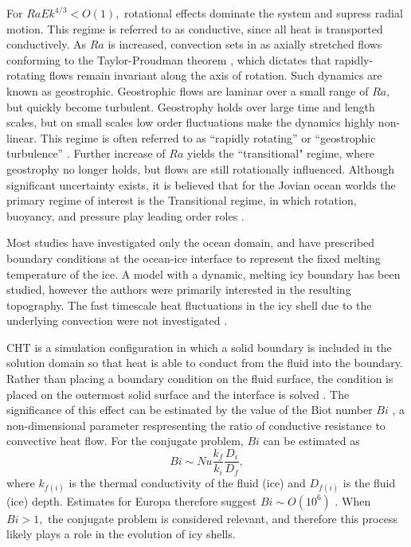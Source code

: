 \documentclass{article}
\def\lb{\left(}
\def\rb{\right)}
\begin{document}
For $RaEk^{4/3}<O\lb 1\rb,$  rotational effects dominate the system and supress radial motion. This regime is referred to as conductive, since all heat is transported conductively. As $Ra$ is increased, convection sets in as axially stretched flows conforming to the Taylor-Proudman theorem \citep{gB53}, which dictates that rapidly-rotating flows remain invariant along the axis of rotation. Such dynamics are known as geostrophic.
Geostrophic flows are laminar over a small range of $Ra,$ but quickly become turbulent. Geostrophy holds over large time and length scales, but on small scales low order fluctuations make the dynamics highly non-linear.
This regime is often referred to as ``rapidly rotating'' or ``geostrophic turbulence'' \citep{kJ12}.
Further increase of $Ra$ yields the ``transitional" regime, where geostrophy no longer holds, but flows are still rotationally influenced.
Although significant uncertainty exists, it is believed that for the Jovian ocean worlds the primary regime of interest is the Transitional regime, in which rotation, buoyancy, and pressure play leading order roles \citep{dL23,tG16}.

Most studies \citep{kS19, dL23} have investigated only the ocean domain, and have prescribed boundary conditions at the ocean-ice interface to represent the fixed melting temperature of the ice. 
A model with a dynamic, melting icy boundary has been studied, however the authors were primarily interested in the resulting topography. The fast timescale heat fluctuations in the icy shell due to the underlying convection were not investigated \citep{jK24}. 

CHT is a simulation configuration in which a solid boundary is included in the solution domain so that heat is able to conduct from the fluid into the boundary. Rather than placing a boundary condition on the fluid surface, the condition is placed on the outermost solid surface and the interface is solved \citep{dA09}. The significance of this effect can be estimated by the value of the Biot number $Bi$ \citep{dA09,jL24}, a non-dimensional parameter respresenting the ratio of conductive resistance to convective heat flow. For the conjugate problem, $Bi$ can be estimated as
\[Bi \sim Nu\frac{k_{f}}{k_{i}}\frac{D_{i}}{D_{f}},\]
where $k_{f\lb i\rb }$ is the thermal conductivity of the fluid (ice) and $D_{f\lb i\rb }$ is the fluid (ice) depth.
Estimates for Europa therefore suggest $Bi \sim O\lb 10^{6}\rb$ \citep{dL23}. When $Bi>1,$ the conjugate problem is considered relevant, and therefore this process likely plays a role in the evolution of icy shells.
\end{document}
